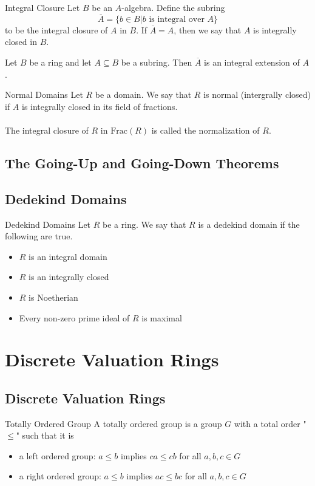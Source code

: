 \documentclass[a4paper]{article}
\begin{document}
\begin{defn}{Integral Closure}{} Let $B$ be an $A$-algebra. Define the subring $$\overline{A}=\{b\in B|b\text{ is integral over }A\}$$ to be the integral closure of $A$ in $B$. If $\overline{A}=A$, then we say that $A$ is integrally closed in $B$. 
\end{defn}

\begin{lmm}{}{} Let $B$ be a ring and let $A\subseteq B$ be a subring. Then $\overline{A}$ is an integral extension of $A$. 
\end{lmm}

\begin{defn}{Normal Domains}{} Let $R$ be a domain. We say that $R$ is normal (intergrally closed) if $A$ is integrally closed in its field of fractions. \\~\\
The integral closure of $R$ in $\text{Frac}(R)$ is called the normalization of $R$. 
\end{defn}

\subsection{The Going-Up and Going-Down Theorems}

\subsection{Dedekind Domains}
\begin{defn}{Dedekind Domains}{} Let $R$ be a ring. We say that $R$ is a dedekind domain if the following are true. 
\begin{itemize}
\item $R$ is an integral domain
\item $R$ is an integrally closed
\item $R$ is Noetherian
\item Every non-zero prime ideal of $R$ is maximal
\end{itemize}
\end{defn}


\pagebreak
\section{Discrete Valuation Rings}
\subsection{Discrete Valuation Rings}
\begin{defn}{Totally Ordered Group}{} A totally ordered group is a group $G$ with a total order "$\leq$" such that it is
\begin{itemize}
\item a left ordered group: $a\leq b$ implies $ca\leq cb$ for all $a,b,c\in G$
\item a right ordered group: $a\leq b$ implies $ac\leq bc$ for all $a,b,c\in G$
\end{itemize}
\end{defn}
\end{document}
